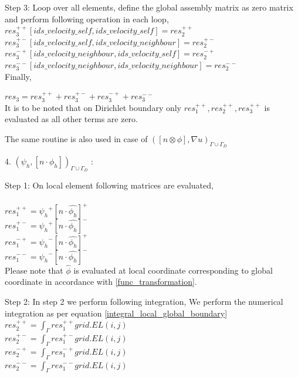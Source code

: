 \documentclass[a4paper,12pt]{book}
\begin{document}
Step 3: Loop over all elements, define the global assembly matrix as zero matrix and perform following operation in each loop,
\\
$res_3^{++}[ids\_velocity\_self,ids\_velocity\_self] = res_2^{++}$\\
$res_3^{+-}[ids\_velocity\_self,ids\_velocity\_neighbour] = res_2^{+-}$\\
$res_3^{-+}[ids\_velocity\_neighbour,ids\_velocity\_self] = res_2^{-+}$\\
$res_3^{--}[ids\_velocity\_neighbour,ids\_velocity\_neighbour] = res_2^{--}$\\

Finally,

$res_3 = res_3^{++} + res_3^{+-} + res_3^{-+} + res_3^{--}$\\

It is to be noted that on Dirichlet boundary only $res_1^{++}, res_2^{++}, res_3^{++}$ is evaluated as all other terms are zero.

The same routine is also used in case of $([n \otimes \phi],{\nabla u})_{\Gamma \cup \Gamma_D}$

4. $({\psi_h}, [n \cdot \phi_h])_{\Gamma \cup \Gamma_D}$ :

Step 1: On local element following matrices are evaluated,\\
\\
$res_1^{++} = {\psi_h}^+ [n \cdot \hat{\phi_h}]^+$\\
$res_1^{+-} = {\psi_h}^+ [n \cdot \hat{\phi_h}]^-$\\
$res_1^{-+} = {\psi_h}^- [n \cdot \hat{\phi_h}]^+$\\
$res_1^{--} = {\psi_h}^- [n \cdot \hat{\phi_h}]^-$\\

Please note that $\hat{\phi}$ is evaluated at local coordinate corresponding to global coordinate in accordance with \ref{func_transformation}.

Step 2: In step 2 we perform following integration, 
We perform the numerical integration as per equation \ref{integral_local_global_boundary}
\\ 
$res_2^{++} = \int_{\Gamma} res_1^{++} grid.EL(i,j)$\\
$res_2^{+-} = \int_{\Gamma} res_1^{+-} grid.EL(i,j)$\\
$res_2^{-+} = \int_{\Gamma} res_1^{-+} grid.EL(i,j)$\\
$res_2^{--} = \int_{\Gamma} res_1^{--} grid.EL(i,j)$\\
\end{document}

